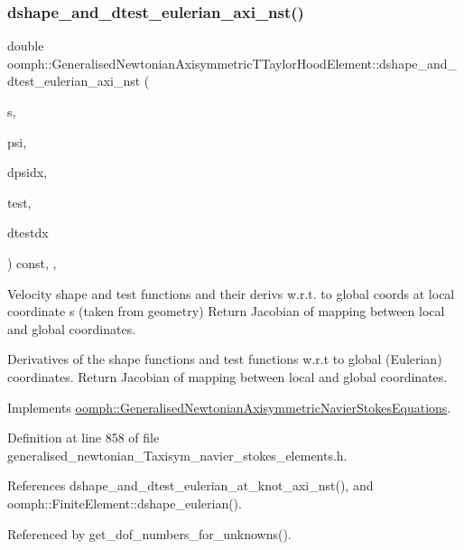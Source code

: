 \subsubsection{\texorpdfstring{dshape\+\_\+and\+\_\+dtest\+\_\+eulerian\+\_\+axi\+\_\+nst()}{dshape\_and\_dtest\_eulerian\_axi\_nst()}}
{\footnotesize\ttfamily double oomph\+::\+Generalised\+Newtonian\+Axisymmetric\+T\+Taylor\+Hood\+Element\+::dshape\+\_\+and\+\_\+dtest\+\_\+eulerian\+\_\+axi\+\_\+nst (\begin{DoxyParamCaption}\item[{const \hyperlink{classoomph_1_1Vector}{Vector}$<$ double $>$ \&}]{s,  }\item[{\hyperlink{classoomph_1_1Shape}{Shape} \&}]{psi,  }\item[{\hyperlink{classoomph_1_1DShape}{D\+Shape} \&}]{dpsidx,  }\item[{\hyperlink{classoomph_1_1Shape}{Shape} \&}]{test,  }\item[{\hyperlink{classoomph_1_1DShape}{D\+Shape} \&}]{dtestdx }\end{DoxyParamCaption}) const\hspace{0.3cm}{\ttfamily [inline]}, {\ttfamily [protected]}, {\ttfamily [virtual]}}



Velocity shape and test functions and their derivs w.\+r.\+t. to global coords at local coordinate s (taken from geometry) Return Jacobian of mapping between local and global coordinates. 

Derivatives of the shape functions and test functions w.\+r.\+t to global (Eulerian) coordinates. Return Jacobian of mapping between local and global coordinates. 

Implements \hyperlink{classoomph_1_1GeneralisedNewtonianAxisymmetricNavierStokesEquations_a9321e8563cb2dfec9824024008a6914e}{oomph\+::\+Generalised\+Newtonian\+Axisymmetric\+Navier\+Stokes\+Equations}.



Definition at line 858 of file generalised\+\_\+newtonian\+\_\+\+Taxisym\+\_\+navier\+\_\+stokes\+\_\+elements.\+h.



References dshape\+\_\+and\+\_\+dtest\+\_\+eulerian\+\_\+at\+\_\+knot\+\_\+axi\+\_\+nst(), and oomph\+::\+Finite\+Element\+::dshape\+\_\+eulerian().



Referenced by get\+\_\+dof\+\_\+numbers\+\_\+for\+\_\+unknowns().

\mbox{\label{classoomph_1_1GeneralisedNewtonianAxisymmetricTTaylorHoodElement_a800da4469b80723056d016b0e5ac4815}} 
